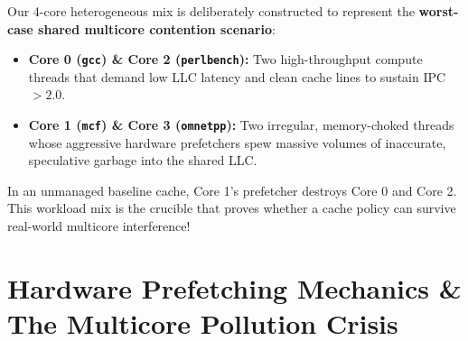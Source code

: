 \documentclass[11pt, a4paper]{article}
\begin{document}
Our 4-core heterogeneous mix is deliberately constructed to represent the \textbf{worst-case shared multicore contention scenario}:
\begin{itemize}[leftmargin=1.5em]
  \item \textbf{Core 0 (\texttt{gcc}) \& Core 2 (\texttt{perlbench}):} Two high-throughput compute threads that demand low LLC latency and clean cache lines to sustain IPC $> 2.0$.
  \item \textbf{Core 1 (\texttt{mcf}) \& Core 3 (\texttt{omnetpp}):} Two irregular, memory-choked threads whose aggressive hardware prefetchers spew massive volumes of inaccurate, speculative garbage into the shared LLC.
\end{itemize}
In an unmanaged baseline cache, Core 1's prefetcher destroys Core 0 and Core 2. This workload mix is the crucible that proves whether a cache policy can survive real-world multicore interference!

\newpage

\section{Hardware Prefetching Mechanics \& The Multicore Pollution Crisis}
\end{document}
